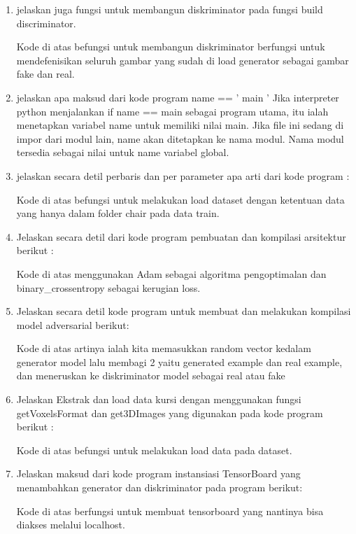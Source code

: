 \begin{enumerate}
	\item  jelaskan juga fungsi untuk membangun diskriminator pada fungsi build discriminator.
    \hfill\break
	
	Kode di atas befungsi untuk membangun diskriminator berfungsi untuk mendefenisikan seluruh gambar yang sudah di load generator sebagai gambar fake dan real.

	\item jelaskan apa maksud dari kode program name == ’ main ’
    \hfill\break
    Jika interpreter python menjalankan if name == main sebagai program utama, itu ialah menetapkan variabel name untuk memiliki nilai main. Jika file ini sedang di impor dari modul lain, name akan ditetapkan ke nama modul. Nama modul tersedia sebagai nilai untuk name variabel global.
    
    \item jelaskan secara detil perbaris dan per parameter apa arti dari kode program :
    
    \hfill\break
    Kode di atas befungsi untuk melakukan load dataset dengan ketentuan data yang hanya dalam folder chair pada data train.
        
    \item Jelaskan secara detil dari kode program pembuatan dan kompilasi arsitektur berikut :
    
    \hfill\break
    Kode di atas menggunakan Adam sebagai algoritma pengoptimalan dan binary\_crossentropy sebagai kerugian loss. 
    
    \item Jelaskan secara detil kode program untuk membuat dan melakukan kompilasi model adversarial berikut:
    
    \hfill\break
    Kode di atas artinya ialah kita memasukkan random vector kedalam generator model lalu membagi 2 yaitu generated example dan real example, dan meneruskan ke diskriminator model sebagai real atau fake
        
    \item Jelaskan Ekstrak dan load data kursi dengan menggunakan fungsi getVoxelsFormat dan get3DImages yang digunakan pada kode program berikut :
    
    \hfill\break
    Kode di atas befungsi untuk melakukan load data pada dataset.
        
    \item Jelaskan maksud dari kode program instansiasi TensorBoard yang menambahkan generator dan diskriminator pada program berikut: 
    
    \hfill\break
    Kode di atas berfungsi untuk membuat tensorboard yang nantinya bisa diakses melalui localhost.
    

\end{enumerate}
